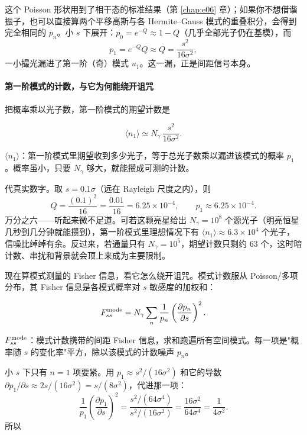 这个 Poisson 形状用到了相干态的标准结果（第 \ref{chap:e06} 章）；如果你不想借谐振子，也可以直接算两个平移高斯与各 Hermite--Gauss 模式的重叠积分，会得到完全相同的 \(p_n\)。小 \(s\) 下展开：\(p_0=e^{-Q}\approx1-Q\)（几乎全部光子仍在基模），而
\[
  p_1=e^{-Q}Q\approx Q=\frac{s^{2}}{16\sigma^{2}},
\]
一小撮光漏进了第一阶（奇）模式 \(u_1\)。这一漏，正是间距信号本身。

\paragraph{第一阶模式的计数，与它为何能绕开诅咒}
\label{sec:e12-mode-fisher}

把概率乘以光子数，第一阶模式的期望计数是

\begin{equation}
  \langle n_1\rangle\simeq N_\gamma\,\frac{s^{2}}{16\sigma^{2}}.
  \label{eq:e12-n1}
\end{equation}
\begin{formulaexplain}
\(\langle n_1\rangle\)：第一阶模式里期望收到多少光子，等于总光子数乘以漏进该模式的概率 \(p_1\)。概率虽小，只要 \(N_\gamma\) 够大，就能攒成可测的计数。
\end{formulaexplain}

代真实数字。取 \(s=0.1\sigma\)（远在 Rayleigh 尺度之内），则
\[
  Q=\frac{(0.1)^2}{16}=\frac{0.01}{16}=6.25\times10^{-4},
  \qquad p_1\approx6.25\times10^{-4}.
\]
万分之六——听起来微不足道。可若这颗亮星给出 \(N_\gamma=10^{8}\) 个源光子（明亮恒星几秒到几分钟就能攒到），第一阶模式里理想情况下有 \(\langle n_1\rangle\approx6.3\times10^{4}\) 个光子，信噪比绰绰有余。反过来，若通量只有 \(N_\gamma=10^{5}\)，期望计数只剩约 63 个，这时暗计数、串扰和背景就会顶上来成为主要限制。

现在算模式测量的 Fisher 信息，看它怎么绕开诅咒。模式计数服从 Poisson/多项分布，其 Fisher 信息是各模式概率对 \(s\) 敏感度的加权和：

\begin{equation}
  F_{ss}^{\rm mode}
  =N_\gamma\sum_{n}\frac{1}{p_n}
  \left(\frac{\partial p_n}{\partial s}\right)^{2}.
  \label{eq:e12-mode-fisher}
\end{equation}
\begin{formulaexplain}
\(F_{ss}^{\rm mode}\)：模式计数携带的间距 Fisher 信息，求和跑遍所有空间模式。每一项是"概率随 \(s\) 的变化率"平方，除以该模式的计数噪声 \(p_n\)。
\end{formulaexplain}

小 \(s\) 下只有 \(n=1\) 项要紧。用 \(p_1\approx s^2/(16\sigma^2)\) 和它的导数 \(\partial p_1/\partial s\approx 2s/(16\sigma^2)=s/(8\sigma^2)\)，代进那一项：
\[
  \frac{1}{p_1}\left(\frac{\partial p_1}{\partial s}\right)^{2}
  =\frac{s^{2}/(64\sigma^{4})}{s^{2}/(16\sigma^{2})}
  =\frac{16\sigma^{2}}{64\sigma^{4}}
  =\frac{1}{4\sigma^{2}}.
\]
所以

